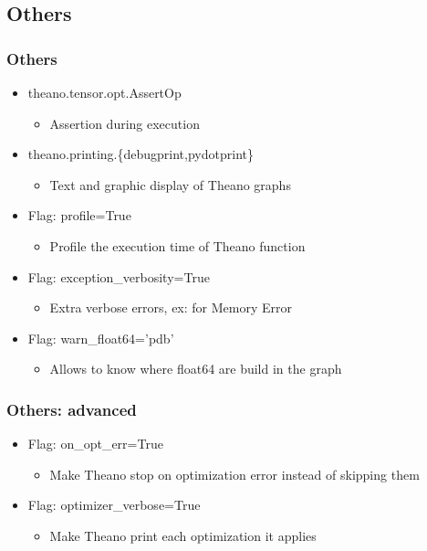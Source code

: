 \documentclass[utf8x,xcolor=pdftex,dvipsnames,table]{beamer}
\begin{document}
\subsection{Others}
\begin{frame}
  \frametitle{Others}
  \begin{itemize}
  \item theano.tensor.opt.AssertOp
    \begin{itemize}
    \item Assertion during execution
    \end{itemize}
  \item theano.printing.\{debugprint,pydotprint\}
    \begin{itemize}
    \item Text and graphic display of Theano graphs
    \end{itemize}
  \item Flag: profile=True
    \begin{itemize}
    \item Profile the execution time of Theano function
    \end{itemize}
  \item Flag: exception\_verbosity=True
    \begin{itemize}
    \item Extra verbose errors, ex: for Memory Error
    \end{itemize}
  \item Flag: warn\_float64='pdb'
    \begin{itemize}
    \item  Allows to know where float64 are build in the graph
    \end{itemize}
  \end{itemize}
\end{frame}

\begin{frame}
  \frametitle{Others: advanced}
  \begin{itemize}
  \item Flag: on\_opt\_err=True
    \begin{itemize}
    \item Make Theano stop on optimization error instead of skipping them
    \end{itemize}
  \item Flag: optimizer\_verbose=True
    \begin{itemize}
    \item Make Theano print each optimization it applies
    \end{itemize}
  \end{itemize}
\end{frame}
\end{document}

